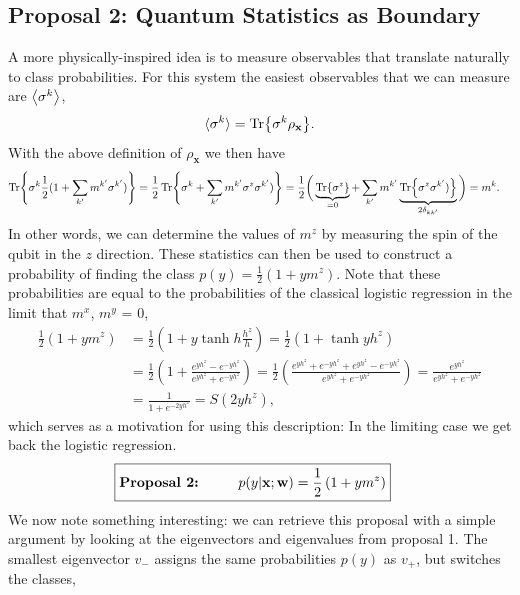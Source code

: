 \subsection{Proposal 2: Quantum Statistics as Boundary \label{sec:mz}}

A more physically-inspired idea is to measure observables that translate naturally to class probabilities. For this system the easiest observables that we can measure are $\expval{\sigma^k}$,
\begin{align*}
   \langle\sigma^k\rangle = \Tr{\sigma^k\rho_\mathbf{x}}.
\end{align*}
With the above definition of $\rho_\mathbf{x}$ we then have 
\begin{align*}
    \Tr{\sigma^k \frac{1}{2}(1 + \sum_{k^\prime} m^{k^\prime} \sigma^{k^\prime})} &= \frac{1}{2}\Tr{\sigma^k + \sum_{k^\prime} m^{k^\prime} \sigma^z\sigma^{k^\prime})}= \frac{1}{2}\bigg(\underbrace{\Tr{\sigma^z}}_{=0} + \sum_{k^\prime} m^{k^\prime} \underbrace{\Tr{\sigma^z\sigma^{k^\prime})}}_{2\delta_{k{k^\prime}}}\bigg) = m^k.
\end{align*}
In other words, we can determine the values of $m^z$ by measuring the spin of the qubit in the $z$ direction. These statistics can then be used to construct a probability of finding the class $p(y)=\frac{1}{2}(1 + y m^z)$. Note that these probabilities are equal to the probabilities of the classical logistic regression in the limit that $m^x$, $m^y$ = 0,
\begin{align*}
    \frac{1}{2}\left(1 + y m^z\right) &=  \frac{1}{2}\left(1 + y \tanh{h}\frac{h^z}{h}\right) = \frac{1}{2}\left(1 + \tanh{y h^z}\right)\\
    & = \frac{1}{2}\left(1 + \frac{e^{yh^z} - e^{-yh^z}}{e^{yh^z} + e^{-yh^z}}\right) = \frac{1}{2}\left(\frac{ e^{yh^z} + e^{-yh^z} + e^{yh^z} - e^{-yh^z}}{e^{yh^z} + e^{-yh^z}}\right) = \frac{ e^{yh^z}}{e^{yh^z} + e^{-yh^z}}\\
    &= \frac{1}{1+e^{-2yh^z}} = S(2yh^z),
\end{align*}
which serves as a motivation for using this description: In the limiting case we get back the logistic regression.
\begin{align*}
    \Aboxed{
    \text{\textbf{Proposal 2:}\hspace{1cm}} p(y|\mathbf{x};\mathbf{w}) = \frac{1}{2}\left(1+ y m^z\right)}
\end{align*}
 We now note something interesting: we can retrieve this proposal with a simple argument by looking at the eigenvectors and eigenvalues from proposal 1. The smallest eigenvector $v_-$ assigns the same probabilities $p(y)$ as $v_+$, but switches the classes,
